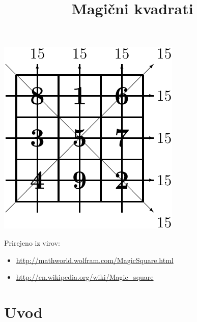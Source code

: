 \documentclass[a4paper,12pt]{article}
\title{Magični kvadrati}
\date{} %
\theoremstyle{definition}
\theoremstyle{plain}
\begin{document}
\maketitle

\begin{center}
   \includegraphics{slika.pdf}
\end{center}

Prirejeno iz virov:

\begin{itemize}
   \item \url{http://mathworld.wolfram.com/MagicSquare.html}
   \item \url{http://en.wikipedia.org/wiki/Magic_square}
\end{itemize}




\tableofcontents



\newpage

\section{Uvod}
\end{document}

